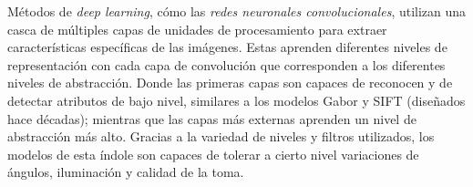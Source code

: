 \documentclass[a4paper, 10pt, conference]{ieeeconf}      %
\begin{document}
    Métodos de \textit{deep learning}, cómo las \textit{redes neuronales convolucionales},
    utilizan una casca de múltiples capas de unidades de procesamiento para extraer
    características específicas de las imágenes. Estas aprenden diferentes niveles de
    representación con cada capa de convolución que corresponden a los diferentes niveles
    de abstracción. Donde las primeras capas son capaces de reconocen y de detectar
    atributos de bajo nivel, similares a los modelos Gabor y SIFT (diseñados hace décadas);
    mientras que las capas más externas aprenden un nivel de abstracción más alto.
    Gracias a la variedad de niveles y filtros utilizados, los modelos de
    esta índole son capaces de tolerar a cierto nivel variaciones de ángulos,
    iluminación y calidad de la toma. \cite{Wang2021}
\end{document}
